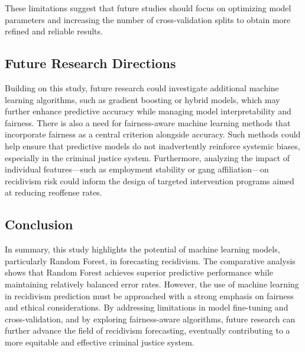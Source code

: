 \documentclass[12pt]{article}
\begin{document}
These limitations suggest that future studies should focus on optimizing model parameters and increasing the number of cross-validation splits to obtain more refined and reliable results.

\subsection{Future Research Directions}

Building on this study, future research could investigate additional machine learning algorithms, such as gradient boosting or hybrid models, which may further enhance predictive accuracy while managing model interpretability and fairness. There is also a need for fairness-aware machine learning methods that incorporate fairness as a central criterion alongside accuracy. Such methods could help ensure that predictive models do not inadvertently reinforce systemic biases, especially in the criminal justice system. Furthermore, analyzing the impact of individual features—such as employment stability or gang affiliation—on recidivism risk could inform the design of targeted intervention programs aimed at reducing reoffense rates.

\subsection{Conclusion}

In summary, this study highlights the potential of machine learning models, particularly Random Forest, in forecasting recidivism. The comparative analysis shows that Random Forest achieves superior predictive performance while maintaining relatively balanced error rates. However, the use of machine learning in recidivism prediction must be approached with a strong emphasis on fairness and ethical considerations. By addressing limitations in model fine-tuning and cross-validation, and by exploring fairness-aware algorithms, future research can further advance the field of recidivism forecasting, eventually contributing to a more equitable and effective criminal justice system.





\end{document}
